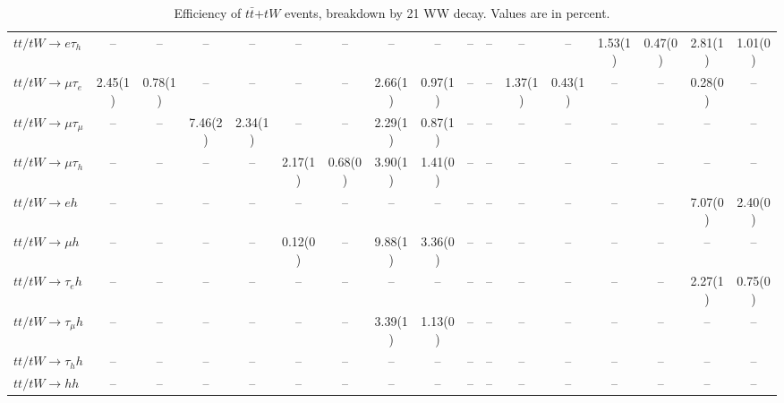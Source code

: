 \begin{sidewaystable}[p]
\begin{tabular}{|l|cc|cc|cc|cc|cc|cc|cc|cc|}
    $tt/tW \to e\tau_{h}$              &    --    &    --    &    --    &    --    &    --    &    --    &    --    &    --    &    --    &    --    &    --    &    --    &  1.53(1) &  0.47(0) &  2.81(1) &  1.01(0) \\ 
    $tt/tW \to \mu\tau_{e}$            &  2.45(1) &  0.78(1) &    --    &    --    &    --    &    --    &  2.66(1) &  0.97(1) &    --    &    --    &  1.37(1) &  0.43(1) &    --    &    --    &  0.28(0) &    --    \\ 
    $tt/tW \to \mu\tau_{\mu}$          &    --    &    --    &  7.46(2) &  2.34(1) &    --    &    --    &  2.29(1) &  0.87(1) &    --    &    --    &    --    &    --    &    --    &    --    &    --    &    --    \\ 
    $tt/tW \to \mu\tau_{h}$            &    --    &    --    &    --    &    --    &  2.17(1) &  0.68(0) &  3.90(1) &  1.41(0) &    --    &    --    &    --    &    --    &    --    &    --    &    --    &    --    \\ 
    $tt/tW \to eh$                     &    --    &    --    &    --    &    --    &    --    &    --    &    --    &    --    &    --    &    --    &    --    &    --    &    --    &    --    &  7.07(0) &  2.40(0) \\ 
    $tt/tW \to \mu h$                  &    --    &    --    &    --    &    --    &  0.12(0) &    --    &  9.88(1) &  3.36(0) &    --    &    --    &    --    &    --    &    --    &    --    &    --    &    --    \\ 
    $tt/tW \to \tau_{e}h$              &    --    &    --    &    --    &    --    &    --    &    --    &    --    &    --    &    --    &    --    &    --    &    --    &    --    &    --    &  2.27(1) &  0.75(0) \\ 
    $tt/tW \to \tau_{\mu}h$            &    --    &    --    &    --    &    --    &    --    &    --    &  3.39(1) &  1.13(0) &    --    &    --    &    --    &    --    &    --    &    --    &    --    &    --    \\ 
    $tt/tW \to \tau_{h}h$              &    --    &    --    &    --    &    --    &    --    &    --    &    --    &    --    &    --    &    --    &    --    &    --    &    --    &    --    &    --    &    --    \\ 
    $tt/tW \to hh$                     &    --    &    --    &    --    &    --    &    --    &    --    &    --    &    --    &    --    &    --    &    --    &    --    &    --    &    --    &    --    &    --    \\ 

    \hline
    \end{tabular}
    \caption{Efficiency of $t\bar{t}$+$tW$ events, breakdown by 21 WW decay.  Values are in percent.}
    \label{sigcomp}
    
\end{sidewaystable}
